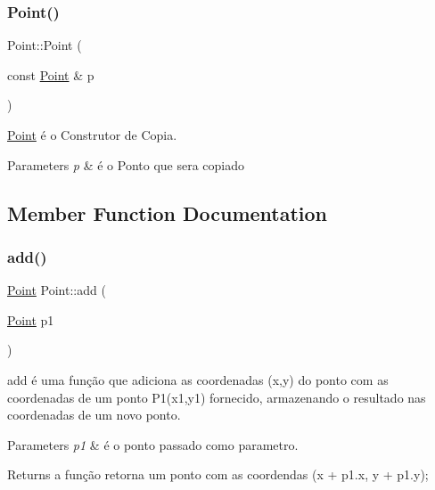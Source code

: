 \subsubsection{\texorpdfstring{Point()}{Point()}\hspace{0.1cm}{\footnotesize\ttfamily [2/2]}}
{\footnotesize\ttfamily Point\+::\+Point (\begin{DoxyParamCaption}\item[{const \mbox{\hyperlink{class_point}{Point}} \&}]{p }\end{DoxyParamCaption})}



\mbox{\hyperlink{class_point}{Point}} é o Construtor de Copia. 


\begin{DoxyParams}{Parameters}
{\em p} & é o Ponto que sera copiado \\
\hline
\end{DoxyParams}


\subsection{Member Function Documentation}
\mbox{\label{class_point_a9dbea84b07b0a8ec3bbb9e58b3d15899}} 
\subsubsection{\texorpdfstring{add()}{add()}}
{\footnotesize\ttfamily \mbox{\hyperlink{class_point}{Point}} Point\+::add (\begin{DoxyParamCaption}\item[{\mbox{\hyperlink{class_point}{Point}}}]{p1 }\end{DoxyParamCaption})}



add é uma função que adiciona as coordenadas (x,y) do ponto com as coordenadas de um ponto P1(x1,y1) fornecido, armazenando o resultado nas coordenadas de um novo ponto. 


\begin{DoxyParams}{Parameters}
{\em p1} & é o ponto passado como parametro. \\
\hline
\end{DoxyParams}
\begin{DoxyReturn}{Returns}
a função retorna um ponto com as coordendas (x + p1.\+x, y + p1.\+y); 
\end{DoxyReturn}
\mbox{\label{class_point_a9aa94b8fd07296e64d304ef3750db113}} 
